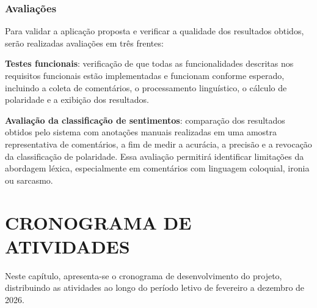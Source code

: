 \documentclass[
	12pt,				%
	openright,			%
	oneside,			%
	a4paper,			%
	english,			%
	brazil				%
	]{abntex2}
\begin{document}
\subsection{Avaliações}
Para validar a aplicação proposta e verificar a qualidade dos resultados obtidos, serão realizadas avaliações em três frentes:

\textbf{Testes funcionais}: verificação de que todas as funcionalidades descritas nos requisitos funcionais estão implementadas e funcionam conforme esperado, incluindo a coleta de comentários, o processamento linguístico, o cálculo de polaridade e a exibição dos resultados.

\textbf{Avaliação da classificação de sentimentos}: comparação dos resultados obtidos pelo sistema com anotações manuais realizadas em uma amostra representativa de comentários, a fim de medir a acurácia, a precisão e a revocação da classificação de polaridade. Essa avaliação permitirá identificar limitações da abordagem léxica, especialmente em comentários com linguagem coloquial, ironia ou sarcasmo.

\chapter{CRONOGRAMA DE ATIVIDADES}
Neste capítulo, apresenta-se o cronograma de desenvolvimento do projeto, distribuindo as atividades ao longo do período letivo de fevereiro a dezembro de 2026.
\end{document}
